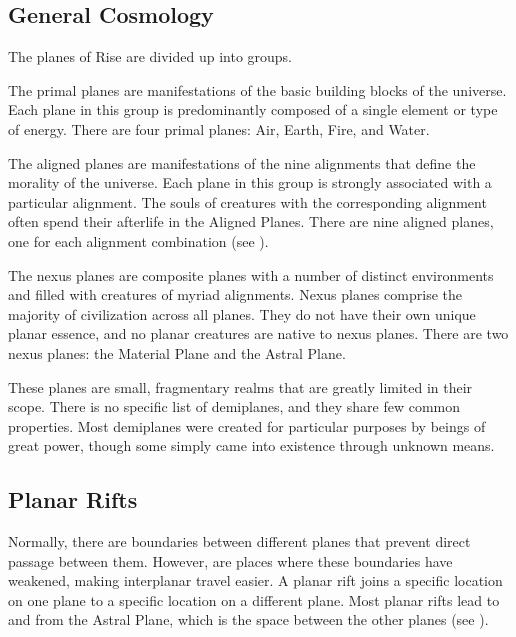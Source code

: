     \subsection{General Cosmology}
        The planes of Rise are divided up into groups.

         The primal planes are manifestations of the basic building blocks of the universe.
        Each plane in this group is predominantly composed of a single element or type of energy.
        There are four primal planes: Air, Earth, Fire, and Water.

         The aligned planes are manifestations of the nine alignments that define the morality of the universe.
        Each plane in this group is strongly associated with a particular alignment.
        The souls of creatures with the corresponding alignment often spend their afterlife in the Aligned Planes.
        There are nine aligned planes, one for each alignment combination (see ).

         The nexus planes are composite planes with a number of distinct environments and filled with creatures of myriad alignments.
        Nexus planes comprise the majority of civilization across all planes.
        They do not have their own unique planar essence, and no planar creatures are native to nexus planes.
        There are two nexus planes: the Material Plane and the Astral Plane.

         These planes are small, fragmentary realms that are greatly limited in their scope.
        There is no specific list of demiplanes, and they share few common properties.
        Most demiplanes were created for particular purposes by beings of great power, though some simply came into existence through unknown means.

    \subsection{Planar Rifts}\label{Planar Rifts}
        Normally, there are boundaries between different planes that prevent direct passage between them.
        However,  are places where these boundaries have weakened, making interplanar travel easier.
        A planar rift joins a specific location on one plane to a specific location on a different plane.
        Most planar rifts lead to and from the Astral Plane, which is the space between the other planes (see ).


